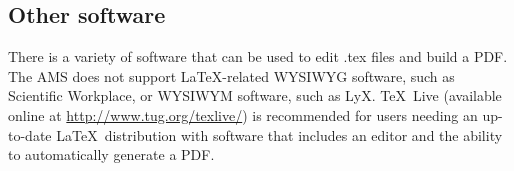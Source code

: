 \documentclass[12pt]{article}
\begin{document}
\begin{appendix}[C]
\subsection{Other software}
There is a variety of software that can be used to edit .tex files and build a PDF.  The AMS does not support \LaTeX\/-related WYSIWYG software, such as Scientific Workplace, or WYSIWYM software, such as LyX.  \TeX\ Live (available online at \url{http://www.tug.org/texlive/}) is recommended for users needing an up-to-date \LaTeX\ distribution with software that includes an editor and the ability to automatically generate a PDF.
\end{appendix}

{}
{\clearpage}


\end{document}
